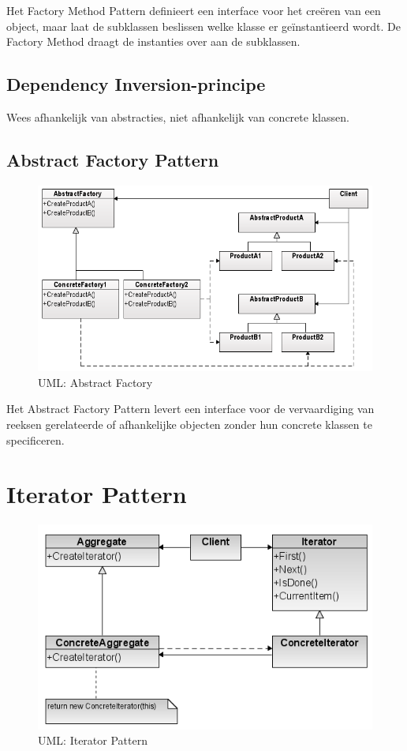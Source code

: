 \documentclass[a4paper,12pt]{article}
\begin{document}
Het Factory Method Pattern definieert een interface voor het creëren van een object, maar laat de subklassen beslissen welke klasse er geïnstantieerd wordt.
De Factory Method draagt de instanties over aan de subklassen.

\subsection{Dependency Inversion-principe}
Wees afhankelijk van abstracties, niet afhankelijk van concrete klassen.

\subsection{Abstract Factory Pattern}
\begin{figure}[H]
\centering
  	\includegraphics[width=.7\linewidth]{img/Factory/AbstractFactory.png}
  	\caption{UML: Abstract Factory}
  	\label{fig:AbstractFactory}
\end{figure}

Het Abstract Factory Pattern levert een interface voor de vervaardiging van reeksen gerelateerde of afhankelijke objecten zonder hun concrete klassen te specificeren.

\section{Iterator Pattern}
\begin{figure}[H]
\centering
  	\includegraphics[width=.7\linewidth]{img/Iterator.png}
  	\caption{UML: Iterator Pattern}
  	\label{fig:Iterator}
\end{figure}
\end{document}
